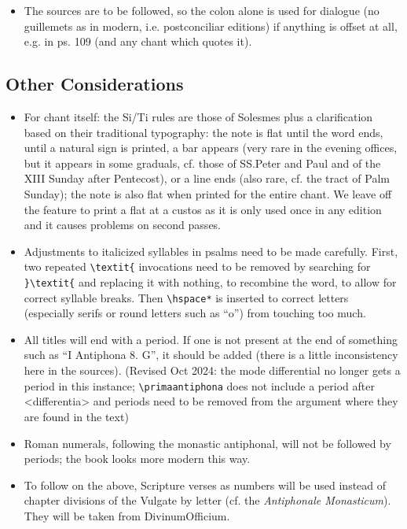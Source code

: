 \documentclass[11pt]{article}
\begin{document}
\begin{itemize}
\item
The sources are to be followed, so the colon alone is used for dialogue (no guillemets as in modern, i.e. postconciliar editions) if anything is offset at all, e.g. in ps. 109 (and any chant which quotes it).

\end{itemize}

\subsection{Other Considerations}
\begin{itemize}
\item
For chant itself: the Si/Ti rules are those of Solesmes plus a clarification based on their traditional typography: the note is flat until the word ends, until a natural sign is printed, a bar appears (very rare in the evening offices, but it appears in some graduals, cf. those of SS.\@ Peter and Paul and of the XIII Sunday after Pentecost), or a line ends (also rare, cf. the tract of Palm Sunday); the note is also flat when printed for the entire chant. We leave off the feature to print a flat at a custos as it is only used once in any edition and it causes problems on second passes.
\item
Adjustments to italicized syllables in psalms need to be made carefully. First, two repeated \verb|\textit{| invocations need to be removed by searching for \verb|}\textit{| and replacing it with nothing, to recombine the word, to allow for correct syllable breaks. Then \verb|\hspace*| is inserted to correct letters (especially serifs or round letters such as ``o'') from touching too much.
\item
All titles will end with a period. If one is not present at the end of something such as ``I Antiphona 8. G'', it should be added (there is a little inconsistency here in the sources). (Revised Oct 2024: the mode differential no longer gets a period in this instance; \verb|\primaantiphona| does not include a period after <differentia> and periods need to be removed from the argument where they are found in the text)
\item
Roman numerals, following the monastic antiphonal, will not be followed by periods; the book looks more modern this way.
\item
To follow on the above, Scripture verses as numbers will be used instead of chapter divisions of the Vulgate by letter (cf. the \textit{Antiphonale Monasticum}). They will be taken from DivinumOfficium.

\end{itemize}
\end{document}
